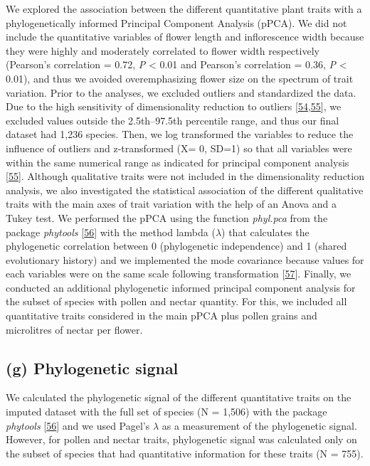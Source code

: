 \documentclass[
  12pt,
  a4paper,
]{article}
\begin{document}
We explored the association between the different quantitative plant traits with a phylogenetically informed Principal Component Analysis (pPCA). We did not include the quantitative variables of flower length and inflorescence width because they were highly and moderately correlated to flower width respectively (Pearson's correlation = 0.72, \emph{P} \textless{} 0.01 and Pearson's correlation = 0.36, \emph{P} \textless{} 0.01), and thus we avoided overemphasizing flower size on the spectrum of trait variation. Prior to the analyses, we excluded outliers and standardized the data. Due to the high sensitivity of dimensionality reduction to outliers {[}\protect\hyperlink{ref-serneels2008}{54},\protect\hyperlink{ref-legendre2012}{55}{]}, we excluded values outside the 2.5th--97.5th percentile range, and thus our final dataset had 1,236 species. Then, we log transformed the variables to reduce the influence of outliers and z-transformed (X= 0, SD=1) so that all variables were within the same numerical range as indicated for principal component analysis {[}\protect\hyperlink{ref-legendre2012}{55}{]}. Although qualitative traits were not included in the dimensionality reduction analysis, we also investigated the statistical association of the different qualitative traits with the main axes of trait variation with the help of an Anova and a Tukey test. We performed the pPCA using the function \emph{phyl.pca} from the package \emph{phytools} {[}\protect\hyperlink{ref-revell2012}{56}{]} with the method lambda (\(\lambda\)) that calculates the phylogenetic correlation between 0 (phylogenetic independence) and 1 (shared evolutionary history) and we implemented the mode covariance because values for each variables were on the same scale following transformation {[}\protect\hyperlink{ref-abdi2010}{57}{]}. Finally, we conducted an additional phylogenetic informed principal component analysis for the subset of species with pollen and nectar quantity. For this, we included all quantitative traits considered in the main pPCA plus pollen grains and microlitres of nectar per flower.

\hypertarget{g-phylogenetic-signal}{%
\subsection{(g) Phylogenetic signal}\label{g-phylogenetic-signal}}

We calculated the phylogenetic signal of the different quantitative traits on the imputed dataset with the full set of species (N = 1,506) with the package \emph{phytools} {[}\protect\hyperlink{ref-revell2012}{56}{]} and we used Pagel's \(\lambda\) as a measurement of the phylogenetic signal. However, for pollen and nectar traits, phylogenetic signal was calculated only on the subset of species that had quantitative information for these traits (N = 755).
\end{document}
